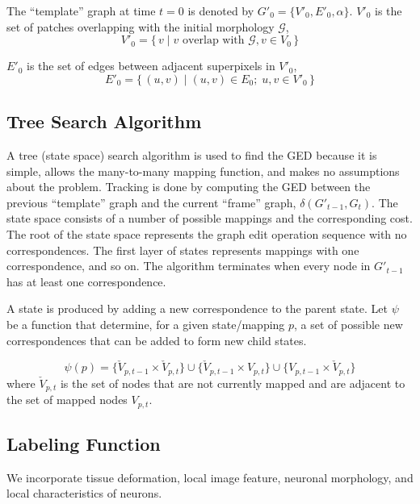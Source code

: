 \documentclass[10pt,letterpaper]{article}
\begin{document}
The ``template'' graph at time $t=0$ is denoted by $G'_0 =  \{V'_0, E'_0, \alpha \}$. $V'_0$ is the set of patches overlapping with the initial morphology $\mathcal{G}$, 
\begin{equation}
V'_0 = \{\,v \mid v \text{ overlap with } \mathcal{G}, v \in V_0 \,\}
\end{equation}

$E'_0$ is the set of edges between adjacent superpixels in $V'_0$, 
\begin{equation}
E'_0 = \{\, (u, v) \mid (u, v) \in E_0 ;\; u, v \in V'_0 \,\}
\end{equation}


\subsection{Tree Search Algorithm}
A tree (state space) search algorithm is used to find the GED because it is simple, allows the many-to-many mapping function, and makes no assumptions about the problem. Tracking is done by computing the GED between the previous ``template'' graph and the current ``frame'' graph, $\delta (G'_{t-1}, G_t)$. The state space consists of a number of possible mappings and the corresponding cost. The root of the state space represents the graph edit operation sequence with no correspondences. The first layer of states represents mappings with one correspondence, and so on. The algorithm terminates when every node in $G'_{t-1}$ has at least one correspondence.

A state is produced by adding a new correspondence to the parent state. Let $\psi$ be a function that determine, for a given state/mapping $p$, a set of possible new correspondences that can be added to form new child states. 

\begin{equation}
\psi(p) = \{ \check{V}_{p,t-1} \times \check{V}_{p,t} \} \cup \{ \check{V}_{p,t-1} \times V_{p,t} \} \cup \{ V_{p,t-1} \times \check{V}_{p,t} \}
\end{equation}
where $\check{V}_{p,t}$ is the set of nodes that are not currently mapped and are adjacent to the set of mapped nodes $V_{p,t}$.


\subsection{Labeling Function}
We incorporate tissue deformation, local image feature, neuronal morphology, and local characteristics of neurons.
\end{document}
